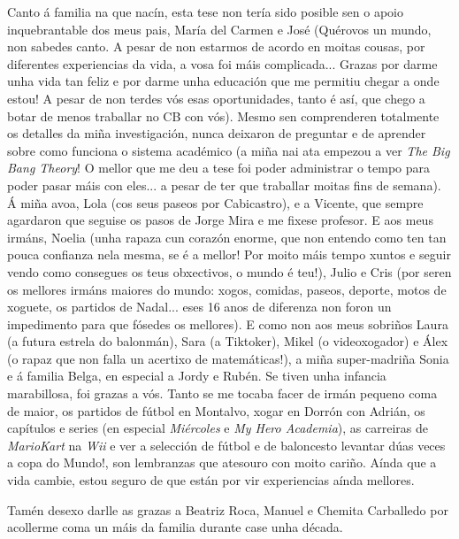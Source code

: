 Canto á familia na que nacín, esta tese non tería sido posible sen o apoio inquebrantable dos meus pais, María del Carmen e José (Quérovos un mundo, non sabedes canto. A pesar de non estarmos de acordo en moitas cousas, por diferentes experiencias da vida, a vosa foi máis complicada... Grazas por darme unha vida tan feliz e por darme unha educación que me permitiu chegar a onde estou! A pesar de non terdes vós esas oportunidades, tanto é así, que chego a botar de menos traballar no CB con vós). Mesmo sen comprenderen totalmente os detalles da miña investigación, nunca deixaron de preguntar e de aprender sobre como funciona o sistema académico (a miña nai ata empezou a ver \textit{The Big Bang Theory}! O mellor que me deu a tese foi poder administrar o tempo para poder pasar máis con eles... a pesar de ter que traballar moitas fins de semana). Á miña avoa, Lola (cos seus paseos por Cabicastro), e a Vicente, que sempre agardaron que seguise os pasos de Jorge Mira e me fixese profesor. E aos meus irmáns, Noelia (unha rapaza cun corazón enorme, que non entendo como ten tan pouca confianza nela mesma, se é a mellor! Por moito máis tempo xuntos e seguir vendo como consegues os teus obxectivos, o mundo é teu!), Julio e Cris (por seren os mellores irmáns maiores do mundo: xogos, comidas, paseos, deporte, motos de xoguete, os partidos de Nadal... eses 16 anos de diferenza non foron un impedimento para que fósedes os mellores). E como non aos meus sobriños Laura (a futura estrela do balonmán), Sara (a Tiktoker), Mikel (o videoxogador) e Álex (o rapaz que non falla un acertixo de matemáticas!), a miña super-madriña Sonia e á familia Belga, en especial a Jordy e Rubén. Se tiven unha infancia marabillosa, foi grazas a vós. Tanto se me tocaba facer de irmán pequeno coma de maior, os partidos de fútbol en Montalvo, xogar en Dorrón con Adrián, os capítulos e series (en especial \textit{Miércoles} e \textit{My Hero Academia}), as carreiras de \textit{MarioKart} na \textit{Wii} e ver a selección de fútbol e de baloncesto levantar dúas veces a copa do Mundo!, son lembranzas que atesouro con moito cariño. Aínda que a vida cambie, estou seguro de que están por vir experiencias aínda mellores.

Tamén desexo darlle as grazas a Beatriz Roca, Manuel e Chemita Carballedo por acollerme coma un máis da familia durante case unha década.

